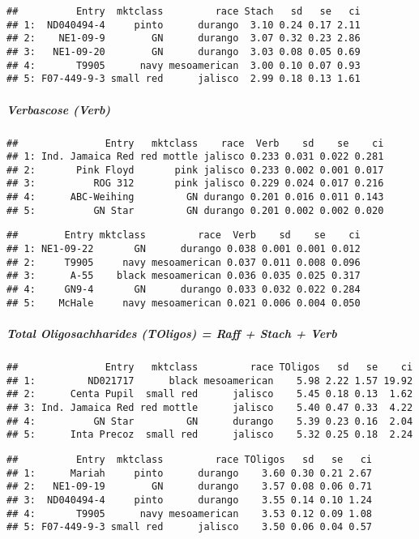 \documentclass[12pt,]{article}
\begin{document}
\begin{verbatim}
##          Entry  mktclass         race Stach   sd   se   ci
## 1:  ND040494-4     pinto      durango  3.10 0.24 0.17 2.11
## 2:    NE1-09-9        GN      durango  3.07 0.32 0.23 2.86
## 3:   NE1-09-20        GN      durango  3.03 0.08 0.05 0.69
## 4:       T9905      navy mesoamerican  3.00 0.10 0.07 0.93
## 5: F07-449-9-3 small red      jalisco  2.99 0.18 0.13 1.61
\end{verbatim}

\subparagraph{Verbascose (Verb)}\label{verbascose-verb}

\begin{verbatim}
##               Entry   mktclass    race  Verb    sd    se    ci
## 1: Ind. Jamaica Red red mottle jalisco 0.233 0.031 0.022 0.281
## 2:       Pink Floyd       pink jalisco 0.233 0.002 0.001 0.017
## 3:          ROG 312       pink jalisco 0.229 0.024 0.017 0.216
## 4:      ABC-Weihing         GN durango 0.201 0.016 0.011 0.143
## 5:          GN Star         GN durango 0.201 0.002 0.002 0.020
\end{verbatim}

\begin{verbatim}
##        Entry mktclass         race  Verb    sd    se    ci
## 1: NE1-09-22       GN      durango 0.038 0.001 0.001 0.012
## 2:     T9905     navy mesoamerican 0.037 0.011 0.008 0.096
## 3:      A-55    black mesoamerican 0.036 0.035 0.025 0.317
## 4:     GN9-4       GN      durango 0.033 0.032 0.022 0.284
## 5:    McHale     navy mesoamerican 0.021 0.006 0.004 0.050
\end{verbatim}

\subparagraph{Total Oligosachharides (TOligos) = Raff + Stach +
Verb}\label{total-oligosachharides-toligos-raff-stach-verb}

\begin{verbatim}
##               Entry   mktclass         race TOligos   sd   se    ci
## 1:         ND021717      black mesoamerican    5.98 2.22 1.57 19.92
## 2:      Centa Pupil  small red      jalisco    5.45 0.18 0.13  1.62
## 3: Ind. Jamaica Red red mottle      jalisco    5.40 0.47 0.33  4.22
## 4:          GN Star         GN      durango    5.39 0.23 0.16  2.04
## 5:      Inta Precoz  small red      jalisco    5.32 0.25 0.18  2.24
\end{verbatim}

\begin{verbatim}
##          Entry  mktclass         race TOligos   sd   se   ci
## 1:      Mariah     pinto      durango    3.60 0.30 0.21 2.67
## 2:   NE1-09-19        GN      durango    3.57 0.08 0.06 0.71
## 3:  ND040494-4     pinto      durango    3.55 0.14 0.10 1.24
## 4:       T9905      navy mesoamerican    3.53 0.12 0.09 1.08
## 5: F07-449-9-3 small red      jalisco    3.50 0.06 0.04 0.57
\end{verbatim}
\end{document}
